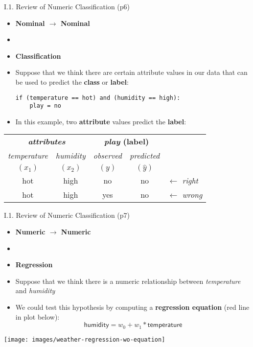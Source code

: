 \documentclass[handout]{beamer}
\newcommand{\strong}[1]{\textbf{\color{teal} #1}}
\newcommand{\stronger}[1]{\textbf{\color{purple} #1}}
\begin{document}
\begin{frame}[fragile]{I.1. Review of Numeric Classification (p6)}
\begin{itemize}
\item[] \strong{Nominal $\rightarrow$ Nominal}
\item[]
\item \stronger{Classification}
\item Suppose that we think there are certain attribute values in our data that can be used to predict the \stronger{class} or \stronger{label}:
\begin{lstlisting}[numbers=none]
if (temperature == hot) and (humidity == high):
	play = no
\end{lstlisting}
\item In this example, two \strong{attribute} values predict the \strong{label}:
\end{itemize}
\begin{center}
\begin{tabular}{|c|c||c|c|l}
\multicolumn{2}{|c||}{\strong{\emph{attributes}}}
                                     & \multicolumn{2}{|c|}{\strong{\emph{play} (label)}} \\
\emph{temperature} & \emph{humidity} & \emph{observed} & \emph{predicted} \\
$(x_1)$            & $(x_2)$         & $(y)$           & $(\hat{y})$ \\
\cline{1-4}
hot & high & no  & {\color{blue}no} & $\leftarrow$ \emph{right}\\
hot & high & yes & {\color{blue}no} & $\leftarrow$ \emph{wrong}\\
\cline{1-4}
\end{tabular}
\end{center}
\end{frame}
\begin{frame}{I.1. Review of Numeric Classification (p7)}
\begin{itemize}
\item[] \strong{Numeric $\rightarrow$ Numeric}
\item[]
\item \stronger{Regression}
\item Suppose that we think there is a numeric relationship between \emph{temperature} and \emph{humidity}
\item We could test this hypothesis by computing a \stronger{regression equation} (red line in plot below):
\[
	\mathsf{humidity} = w_0 + w_1 * \mathsf{temperature}
\]
\end{itemize}
\vspace{-0.7cm}

\begin{center}
\texttt{[image: images/weather-regression-wo-equation]}
\end{center}
\end{frame}
\end{document}
